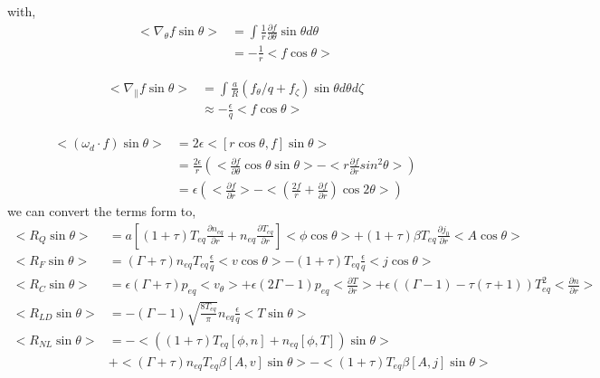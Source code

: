 \documentclass[11pt,a4paper]{article}
\begin{document}
	with,
	\begin{equation}
	\begin{aligned}
		<\nabla_\theta{f}\sin\theta>
		&=\int \frac{1}{r}\frac{\partial{f}}{\partial\theta}\sin\theta{d\theta}\\
		&=-\frac{1}{r}<f\cos\theta>
	\end{aligned}
	\end{equation}

	\begin{equation}
	\begin{aligned}
		<\nabla_\parallel{f}\sin\theta>
		&=\int \frac{a}{R}(f_\theta/q+f_\zeta)\sin\theta{d\theta}{d\zeta}\\
		&\approx-\frac{\epsilon}{q}<f\cos\theta>
	\end{aligned}		
	\end{equation}

	\begin{equation}
	\begin{aligned}
		<(\omega_d\cdot{f})\sin\theta>
		&=2\epsilon<[r\cos\theta,f]\sin\theta>	\\
		&=\frac{2\epsilon}{r}(<\frac{\partial{f}}{\partial\theta}\cos\theta\sin\theta>-<r\frac{\partial{f}}{\partial{r}}sin^2\theta>) \\
		&=\epsilon(<\frac{\partial{f}}{\partial{r}}>
		-<(\frac{2f}{r}+\frac{\partial{f}}{\partial{r}})\cos{2\theta}>)
	\end{aligned}
	\end{equation}
	we can convert the terms form to,
	\begin{equation}
	\begin{aligned}
		<R_Q\sin\theta>&=
		a[(1+\tau)T_{eq}\frac{\partial{n_{eq}}}{\partial{r}}+n_{eq}\frac{\partial{T_{eq}}}{\partial{r}}]<\phi\cos\theta>
		+(1+\tau)\beta{T_{eq}}\frac{\partial{j_0}}{\partial{r}}<A\cos\theta>\\
		<R_F\sin\theta>&=
		(\Gamma+\tau)n_{eq}T_{eq}\frac{\epsilon}{q}<v\cos\theta>
		-(1+\tau)T_{eq}\frac{\epsilon}{q}<j\cos\theta>	\\
		<R_C\sin\theta>&=
		\epsilon(\Gamma+\tau)p_{eq}<v_\theta>
		+\epsilon(2\Gamma-1)p_{eq}<\frac{\partial{T}}{\partial{r}}>
		+\epsilon((\Gamma-1)-\tau(\tau+1))T_{eq}^2<\frac{\partial{n}}{\partial{r}}>	\\
		<R_{LD}\sin\theta>&=
		-(\Gamma-1)\sqrt{\frac{8T_{eq}}{\pi}}n_{eq}\frac{\epsilon}{q}<T\sin\theta>	\\
		<R_{NL}\sin\theta>&=
		-<((1+\tau)T_{eq}[\phi,n]+n_{eq}[\phi,T])\sin\theta>	\\
		&+<(\Gamma+\tau)n_{eq}T_{eq}\beta[A,v]\sin\theta>
		-<(1+\tau)T_{eq}\beta[A,j]\sin\theta>
	\end{aligned}
	\end{equation}
	
\end{document}
